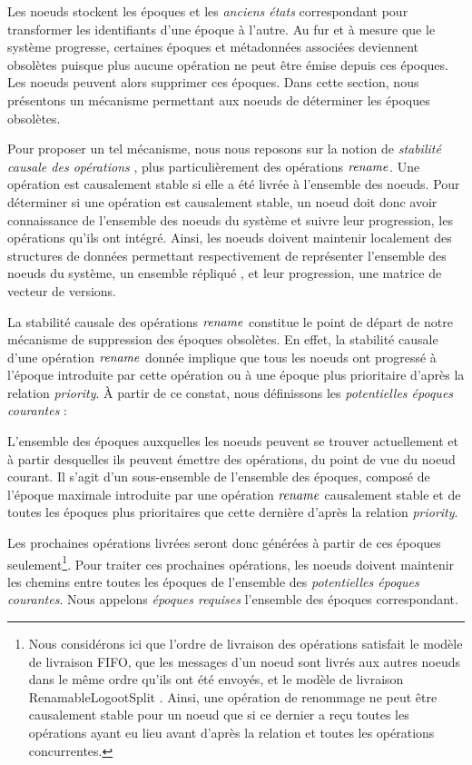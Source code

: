 \label{sec:gc-mechanism}

Les noeuds stockent les époques et les \emph{anciens états} correspondant pour transformer les identifiants d'une époque à l'autre.
Au fur et à mesure que le système progresse, certaines époques et métadonnées associées deviennent obsolètes puisque plus aucune opération ne peut être émise depuis ces époques.
Les noeuds peuvent alors supprimer ces époques.
Dans cette section, nous présentons un mécanisme permettant aux noeuds de déterminer les époques obsolètes.

Pour proposer un tel mécanisme, nous nous reposons sur la notion de \emph{stabilité causale des opérations} \cite{10.1007/978-3-662-43352-2_11}, plus particulièrement des opérations $\mathit{rename}$.
Une opération est causalement stable si elle a été livrée à l'ensemble des noeuds.
Pour déterminer si une opération est causalement stable, un noeud doit donc avoir connaissance de l'ensemble des noeuds du système et suivre leur progression, \ie les opérations qu'ils ont intégré.
Ainsi, les noeuds doivent maintenir localement des structures de données permettant respectivement de représenter l'ensemble des noeuds du système, \eg un ensemble répliqué \cite{shapiro:inria-00555588, 2020-cl-set-weihai}, et leur progression, \eg une matrice de vecteur de versions.

La stabilité causale des opérations $\mathit{rename}$ constitue le point de départ de notre mécanisme de suppression des époques obsolètes.
En effet, la stabilité causale d'une opération $\mathit{rename}$ donnée implique que tous les noeuds ont progressé à l'époque introduite par cette opération ou à une époque plus prioritaire d'après la relation \emph{priority}.
À partir de ce constat, nous définissons les \emph{potentielles époques courantes} :

\begin{definition}
  L'ensemble des époques auxquelles les noeuds peuvent se trouver actuellement et à partir desquelles ils peuvent émettre des opérations, du point de vue du noeud courant.
  Il s'agit d'un sous-ensemble de l'ensemble des époques, composé de l'époque maximale introduite par une opération $\mathit{rename}$ causalement stable et de toutes les époques plus prioritaires que cette dernière d'après la relation \emph{priority}.
\end{definition}

Les prochaines opérations livrées seront donc générées à partir de ces époques seulement\footnote{
    Nous considérons ici que l'ordre de livraison des opérations satisfait le modèle de livraison FIFO, \ie que les messages d'un noeud sont livrés aux autres noeuds dans le même ordre qu'ils ont été envoyés, et le modèle de livraison RenamableLogootSplit .
    Ainsi, une opération de renommage ne peut être causalement stable pour un noeud que si ce dernier a reçu toutes les opérations ayant eu lieu avant d'après la relation \hb et toutes les opérations concurrentes.
}.
Pour traiter ces prochaines opérations, les noeuds doivent maintenir les chemins entre toutes les époques de l'ensemble des \emph{potentielles époques courantes}.
Nous appelons \emph{époques requises} l'ensemble des époques correspondant.

